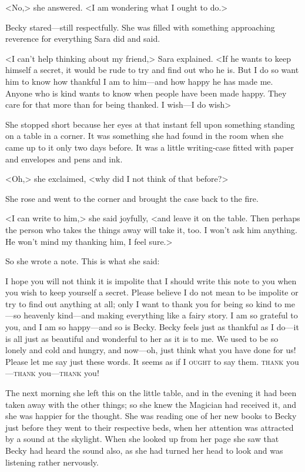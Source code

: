 <No,> she answered. <I am wondering what I ought to do.>

Becky stared—still respectfully. She was filled with something approaching reverence for everything Sara did and said.

<I can't help thinking about my friend,> Sara explained. <If he wants to keep himself a secret, it would be rude to try and find out who he is. But I do so want him to know how thankful I am to him—and how happy he has made me. Anyone who is kind wants to know when people have been made happy. They care for that more than for being thanked. I wish—I do wish\longdash>

She stopped short because her eyes at that instant fell upon something standing on a table in a corner. It was something she had found in the room when she came up to it only two days before. It was a little writing-case fitted with paper and envelopes and pens and ink.

<Oh,> she exclaimed, <why did I not think of that before?>

She rose and went to the corner and brought the case back to the fire.

<I can write to him,> she said joyfully, <and leave it on the table. Then perhaps the person who takes the things away will take it, too. I won't ask him anything. He won't mind my thanking him, I feel sure.>

So she wrote a note. This is what she said:

\begin{mail}{}{}
	
I hope you will not think it is impolite that I should write this note to you when you wish to keep yourself a secret. Please believe I do not mean to be impolite or try to find out anything at all; only I want to thank you for being so kind to me—so heavenly kind—and making everything like a fairy story. I am so grateful to you, and I am so happy—and so is Becky. Becky feels just as thankful as I do—it is all just as beautiful and wonderful to her as it is to me. We used to be so lonely and cold and hungry, and now—oh, just think what you have done for us! Please let me say just these words. It seems as if I \textsc{ought} to say them. \textsc{thank} you—\textsc{thank} you—\textsc{thank} you!

\end{mail}


The next morning she left this on the little table, and in the evening it had been taken away with the other things; so she knew the Magician had received it, and she was happier for the thought. She was reading one of her new books to Becky just before they went to their respective beds, when her attention was attracted by a sound at the skylight. When she looked up from her page she saw that Becky had heard the sound also, as she had turned her head to look and was listening rather nervously.

